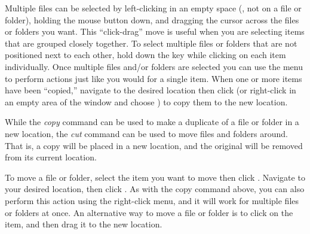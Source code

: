 Multiple files can be selected by left-clicking in an empty space (\ie, not on a file or folder), holding the mouse button down, and dragging the cursor across the files or folders you want.  This ``click-drag'' move is useful when you are selecting items that are grouped closely together. To select multiple files or folders that are not positioned next to each other, hold down the  key while clicking on each item individually. Once multiple files and/or folders are selected you can use the  menu to perform actions just like you would for a single item.%
When one or more items have been ``copied,'' navigate to the desired location then click  (or right-click in an empty area of the window and choose ) to copy them to the new location.

While the \emph{copy} command can be used to make a duplicate of a file or folder in a new location, the \emph{cut} command can be used to move files and folders around. That is, a copy will be placed in a new location, and the original will be removed from its current location.

To move a file or folder, select the item you want to move then click . Navigate to your desired location, then click .  As with the copy command above, you can also perform this action using the right-click menu, and it will work for multiple files or folders at once. An alternative way to move a file or folder is to click on the item, and then drag it to the new location.

\begin{comment}
Is this true? I couldn't get it to work for me --jaminday
\marginnote{If you click on a file or folder with both the left and right mouse buttons at the same time, keep holding and drag it to your destination folder. When you let go of both mouse buttons, a menu will appear asking whether you want to \emph{copy, move} or \emph{link} the item.}
\end{comment}


